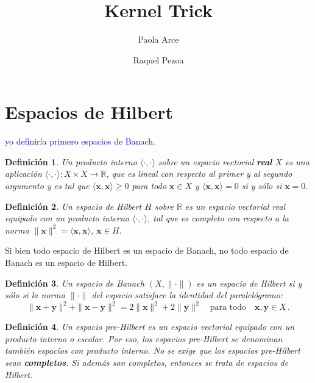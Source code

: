 \documentclass[12pt,reqno]{amsart}
\title{Kernel Trick}
\author{Paola Arce \and Raquel Pezoa}
\newtheorem*{mydef}{Definici\'on}
\begin{document}
\maketitle




\section{Espacios de Hilbert}

\textcolor{blue}{yo definir\'ia primero espacios de Banach.}

\begin{mydef}
Un producto interno $\langle\cdot,\cdot\rangle$ sobre un espacio vectorial
{\bf real} $X$ es una aplicaci\'on 
$\langle\cdot,\cdot\rangle:X\times X\to\mathbb{R}$,
que es lineal con respecto al primer y al segundo argumento
y es tal que 
$\langle\mathbf{x}, \mathbf{x}\rangle\geq0$ para todo $\mathbf{x}\in X$
y $\langle\mathbf{x}, \mathbf{x}\rangle=0$ si y s\'olo si $\mathbf{x}=0$.
\end{mydef}

\begin{mydef}
Un espacio de Hilbert $H$ sobre $\mathbb{R}$ es un espacio vectorial real
equipado con un producto interno $\langle\cdot,\cdot\rangle$, tal que
es completo con respecto a la norma
$\|\mathbf{x}\|^{2}= \langle\mathbf{x},\mathbf{x}\rangle$,
$\mathbf{x}\in H$.
\end{mydef}

Si bien todo espacio de Hilbert es un espacio de Banach, 
no todo espacio de Banach es un espacio de Hilbert.

\begin{mydef}
Un espacio de Banach $(X,\|\cdot\|)$ es un espacio de Hilbert
si y s\'olo si la norma $\|\cdot\|$ del espacio satisface la
identidad del paralel\'ogramo:
$$
\|\mathbf{x}+\mathbf{y}\|^2+\|\mathbf{x}-\mathbf{y}\|^2
= 2\|\mathbf{x}\|^2+2\|\mathbf{y}\|^2\quad
\text{para todo}\quad \mathbf{x},\mathbf{y}\in X\,.
$$
\end{mydef}

\begin{mydef}
Un espacio pre-Hilbert es un espacio vectorial equipado con un producto
interno o escalar.
Por eso, los espacios pre-Hilbert se denominan tambi\'en espacios con
producto interno.
No se exige que los espacios pre-Hilbert sean {\bf completos}.
Si adem\'as son completos, entonces se trata de espacios de Hilbert.
\end{mydef}
\end{document}
